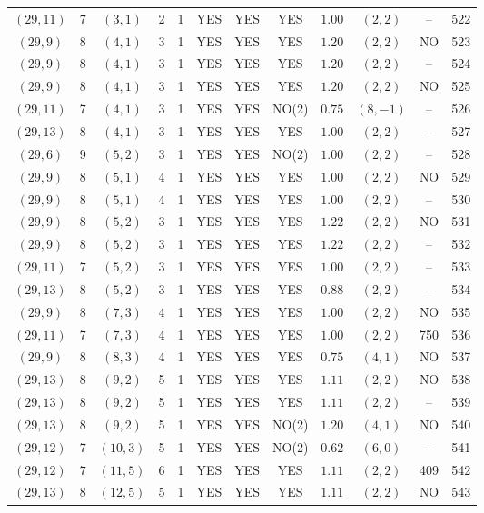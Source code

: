 \begin{longtable}{|c|c|c|c|c|c|c|c|c|c|c|c|}
$(29,11)$ & 7 & $(3,1)$ & 2 & 1 & YES & YES & YES & $1.00$ & $(2,2)$ & -- & 522\\
$(29,9)$ & 8 & $(4,1)$ & 3 & 1 & YES & YES & YES & $1.20$ & $(2,2)$ & NO & 523\\
$(29,9)$ & 8 & $(4,1)$ & 3 & 1 & YES & YES & YES & $1.20$ & $(2,2)$ & -- & 524\\
$(29,9)$ & 8 & $(4,1)$ & 3 & 1 & YES & YES & YES & $1.20$ & $(2,2)$ & NO & 525\\
$(29,11)$ & 7 & $(4,1)$ & 3 & 1 & YES & YES & NO(2) & $0.75$ & $(8,-1)$ & -- & 526\\
$(29,13)$ & 8 & $(4,1)$ & 3 & 1 & YES & YES & YES & $1.00$ & $(2,2)$ & -- & 527\\
$(29,6)$ & 9 & $(5,2)$ & 3 & 1 & YES & YES & NO(2) & $1.00$ & $(2,2)$ & -- & 528\\
$(29,9)$ & 8 & $(5,1)$ & 4 & 1 & YES & YES & YES & $1.00$ & $(2,2)$ & NO & 529\\
$(29,9)$ & 8 & $(5,1)$ & 4 & 1 & YES & YES & YES & $1.00$ & $(2,2)$ & -- & 530\\
$(29,9)$ & 8 & $(5,2)$ & 3 & 1 & YES & YES & YES & $1.22$ & $(2,2)$ & NO & 531\\
$(29,9)$ & 8 & $(5,2)$ & 3 & 1 & YES & YES & YES & $1.22$ & $(2,2)$ & -- & 532\\
$(29,11)$ & 7 & $(5,2)$ & 3 & 1 & YES & YES & YES & $1.00$ & $(2,2)$ & -- & 533\\
$(29,13)$ & 8 & $(5,2)$ & 3 & 1 & YES & YES & YES & $0.88$ & $(2,2)$ & -- & 534\\
$(29,9)$ & 8 & $(7,3)$ & 4 & 1 & YES & YES & YES & $1.00$ & $(2,2)$ & NO & 535\\
$(29,11)$ & 7 & $(7,3)$ & 4 & 1 & YES & YES & YES & $1.00$ & $(2,2)$ & 750 & 536\\
$(29,9)$ & 8 & $(8,3)$ & 4 & 1 & YES & YES & YES & $0.75$ & $(4,1)$ & NO & 537\\
$(29,13)$ & 8 & $(9,2)$ & 5 & 1 & YES & YES & YES & $1.11$ & $(2,2)$ & NO & 538\\
$(29,13)$ & 8 & $(9,2)$ & 5 & 1 & YES & YES & YES & $1.11$ & $(2,2)$ & -- & 539\\
$(29,13)$ & 8 & $(9,2)$ & 5 & 1 & YES & YES & NO(2) & $1.20$ & $(4,1)$ & NO & 540\\
$(29,12)$ & 7 & $(10,3)$ & 5 & 1 & YES & YES & NO(2) & $0.62$ & $(6,0)$ & -- & 541\\
$(29,12)$ & 7 & $(11,5)$ & 6 & 1 & YES & YES & YES & $1.11$ & $(2,2)$ & 409 & 542\\
$(29,13)$ & 8 & $(12,5)$ & 5 & 1 & YES & YES & YES & $1.11$ & $(2,2)$ & NO & 543\\

\end{longtable}
